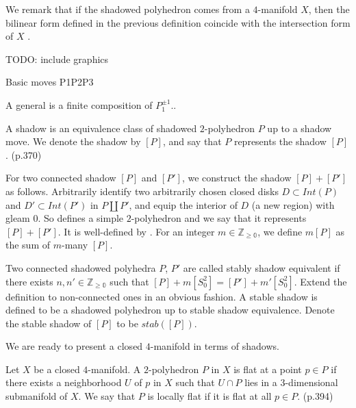 \noindent We remark that if the shadowed polyhedron comes from a
$4$-manifold $X$, then the bilinear form defined in the previous
definition coincide with the intersection form of $X$
\cite[section IX.5]{turaev-qiok-3-manifolds}.

\begin{definition}\label{def/shadow-moves}

  TODO: include graphics

  Basic moves P1P2P3

  A general is a finite composition of $P_1^{\pm 1}$..
\end{definition}

\begin{definition}[shadow]\label{def/shadow}
  A shadow is an equivalence class of shadowed $2$-polyhedron $P$
  up to a shadow move. We denote the shadow by $[P]$, and say
  that $P$ represents the shadow $[P]$. (p.370)
\end{definition}

\noindent For two connected shadow $[P]$ and $[P']$, we construct
the shadow $[P]+[P']$ as follows. Arbitrarily identify two
arbitrarily chosen closed disks $D \subset Int(P)$ and
$D' \subset Int(P')$ in $P \coprod P'$, and equip the interior of
$D$ (a new region) with gleam $0$. So defines a simple
$2$-polyhedron and we say that it represents $[P]+[P']$. It is
well-defined by \cite[lemma VIII.2.1.1]{turaev-qiok-3-manifolds}.
For an integer $m \in \mathbb{Z_{\geq 0}}$, we define $m[P]$ as
the sum of $m$-many $[P]$.

\begin{definition}\label{def/stable-shadow}
  Two connected shadowed polyhedra $P$, $P'$ are called stably
  shadow equivalent if there exists
  $n, n' \in \mathbb{Z_{\geq 0}}$ such that
  $[P] + m[S^{2}_{0}] = [P'] + m'[S^{2}_{0}]$. Extend the
  definition to non-connected ones in an obvious fashion. A
  stable shadow is defined to be a shadowed polyhedron up to
  stable shadow equivalence. Denote the stable shadow of $[P]$ to
  be $stab([P])$.
\end{definition}

\noindent We are ready to present a closed $4$-manifold in terms
of shadows.

\begin{definition}\label{def/locally-flat-2-polyhedron-in-a-4-manifold}
  Let $X$ be a closed $4$-manifold. A $2$-polyhedron $P$ in $X$
  is flat at a point $p \in P$ if there exists a neighborhood $U$
  of $p$ in $X$ such that $U \cap P$ lies in a $3$-dimensional
  submanifold of $X$. We say that $P$ is locally flat if it is
  flat at all $p \in P$. (p.394)
\end{definition}

